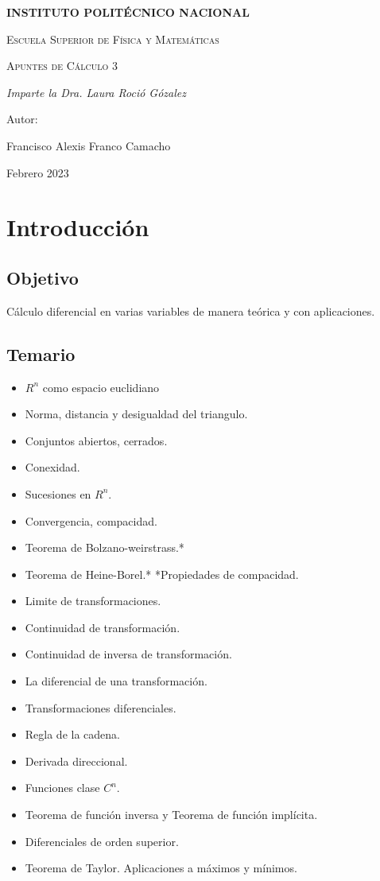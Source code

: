 \documentclass{book}
\begin{document}
\begin{titlepage}
\centering
{\bfseries\LARGE INSTITUTO POLITÉCNICO NACIONAL \par}
\vspace{1cm}
{\scshape\Large Escuela Superior de Física y Matemáticas \par}
\vspace{3cm}
{\scshape\Huge Apuntes de Cálculo 3 \par}
\vspace{3cm}
{\itshape\Large Imparte la Dra. Laura Roció Gózalez  \par}
\vfill
{\Large Autor: \par}
{\Large Francisco Alexis Franco Camacho \par}
\vfill
{\Large Febrero 2023 \par}
\end{titlepage}
\tableofcontents
\chapter{Introducción}
\section{Objetivo}
Cálculo diferencial en varias variables de manera teórica y con aplicaciones.
\section{Temario}
\begin{itemize}
\item $R^n$ como espacio euclidiano
\item Norma, distancia y desigualdad del triangulo.
\item Conjuntos abiertos, cerrados.
\item Conexidad.
\item Sucesiones en $R^n$.
\item Convergencia, compacidad.
\item Teorema de Bolzano-weirstrass.*
\item Teorema de Heine-Borel.*
*Propiedades de compacidad.
\item Limite de transformaciones.
\item Continuidad de transformación.
\item Continuidad de inversa de transformación.
\item La diferencial de una transformación.
\item Transformaciones diferenciales.
\item Regla de la cadena.
\item Derivada direccional.
\item Funciones clase $C^n$.
\item Teorema de función inversa y Teorema de función implícita.
\item Diferenciales de orden superior.
\item Teorema de Taylor. Aplicaciones a máximos y mínimos.
\end{itemize}
\end{document}
